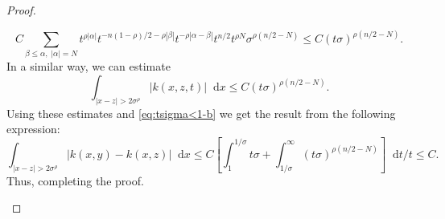 \documentclass[12pt, reqno]{amsart}
\theoremstyle{definition}
\theoremstyle{remark}
\numberwithin{equation}{section}
\newcommand*\diff{\mathop{}\!\mathrm{d}}
\begin{document}
\begin{proof}
\begin{itemize}
        \begin{equation*}
            C\sum_{\beta\leq\alpha,\; |\alpha|=N} t^{\rho|\alpha|}t^{-n(1-\rho)/2 - \rho|\beta|}t^{-\rho|\alpha-\beta|}t^{n/2}t^{\rho N} \sigma^{\rho(n/2 - N)} \leq C(t\sigma)^{\rho (n/2 - N)}.
        \end{equation*}
        In a similar way, we can estimate 
        \begin{equation*}
            \int_{|x-z|>2\sigma^\rho} |k(x, z, t)| \diff x \leq C(t\sigma)^{\rho(n/2 - N)}.
        \end{equation*}
        Using these estimates and \cref{eq:tsigma<1-b} we get the result from the following expression:
        \begin{equation}
            \int_{|x-z| > 2\sigma^\rho}|k(x, y) - k(x, z)|\diff x \leq C\left[ \int_1^{1/\sigma} t\sigma + \int_{1/\sigma}^\infty(t\sigma)^{\rho(n/2-N)} \right]\diff t/t \leq C
            \label{eq:lastbound-b}.
        \end{equation} 
        Thus, completing the proof.\\


\end{itemize}
\end{proof}
\end{document}
